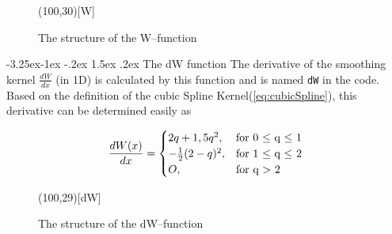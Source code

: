 \documentclass{report}
\makeatletter
\renewcommand\paragraph{\@startsection{paragraph}{4}{\z@}%
  {-3.25ex\@plus -1ex \@minus -.2ex}%
  {1.5ex \@plus .2ex}%
  {\normalfont\normalsize\bfseries}}
\makeatother
\begin{document}
\begin{figure}[H]
\label{fig:W_structure}  

\begin{center}
\begin{struktogramm}(100,30)[W]
    \caseend
\end{struktogramm}
\end{center}

\caption{The structure of the W--function}
\end{figure}

\paragraph{The dW function}
The derivative of the smoothing kernel $\frac{dW}{dx}$ (in 1D) is calculated by this function and is named {\tt dW} in the code. Based on the definition of the cubic Spline Kernel(\ref{eq:cubicSpline}), this derivative can be determined easily as

\begin{equation}
\label{eq:cubicSplineDer}
\frac{dW(x)}{dx}=\begin{cases}
\-2q+1,5q^2,& \text{for 0 $\leq$ q $\leq$ 1} \\
-\frac{1}{2}(2-q)^{2},&  \text{for 1 $\leq$ q $\leq$ 2} \\
O,& \text{for q $>$ 2}
\end{cases}
\end{equation}


\begin{figure}[H]
\label{fig:dW_structure}  

\begin{center}
\begin{struktogramm}(100,29)[dW]
    \caseend

\end{struktogramm}
\end{center}

\caption{The structure of the dW--function}
\end{figure}
\end{document}
